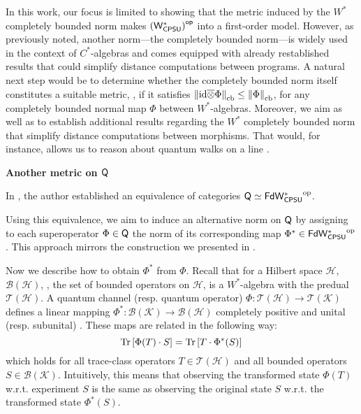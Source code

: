 In this work, our focus is limited to showing that the metric induced by the $W^*$ completely bounded norm makes $\left(\mathsf{W^*_{CPSU}}\right)^{\mathsf{op}}$ into a first-order model. However, as previously noted, another norm---the completely bounded norm---is widely used in the context of $C^*$-algebras and comes equipped with already restablished results that could simplify distance computations between programs.  A natural next step would be to determine whether the completely bounded norm itself constitutes a suitable metric, \ie, if it satisfies $\left\lVert \mathrm{id} \overline{\otimes} \Phi \right\rVert_{\text{cb}} \leq \left\lVert \Phi \right\rVert_{\text{cb}}$, for any completely bounded normal map $\Phi$ between $W^*$-algebras. Moreover, we aim as well as to establish additional results regarding the $W^*$ completely bounded norm that simplify distance computations between morphisms. That would, for instance, allows us to reason about quantum walks on a line \cite{venegasQuantumWalksComprehensive2012}.

\textbf{Another metric on $\mathsf{Q}$}



In \cite{choSemanticsQuantumProgramming2016}, the author established an equivalence of categories  
$\mathsf{Q} \simeq \mathsf{FdW^*_{CPSU}}^{\mathrm{op}}$.  

Using this equivalence, we aim to induce an alternative norm on $\mathsf{Q}$ by assigning to each superoperator $\Phi \in \mathsf{Q}$ the norm of its corresponding map $\Phi^* \in \mathsf{FdW^*_{CPSU}}^{\mathrm{op}}$. This approach mirrors the construction we presented in .

Now we describe how to obtain  $\Phi^*$ from $\Phi$. 
Recall that for a Hilbert space \( \mathcal{H} \), \( \mathcal{B}(\mathcal{H}) \), \ie, the set of bounded operators on \( \mathcal{H} \), is a \( W^* \)-algebra with the predual \( \mathcal{T}(\mathcal{H}) \).
A quantum channel (resp. quantum operator) $\Phi: \mathcal{T}(\mathcal{H})  \to \mathcal{T}(\mathcal{K})$ defines a linear mapping 
$\Phi^*: \mathcal{B}(\mathcal{K}) \to \mathcal{B}(\mathcal{H})$ completely positive and unital (resp. subunital) \cite[Proposition 5.1,]{choSemanticsQuantumProgramming2016}. These maps are related in the following way:
\begin{equation*}
\text{Tr}\left[\Phi(T) \cdot S\right] = \text{Tr} \left[T \cdot \Phi^*(S)\right]
\end{equation*}
which holds for all trace-class operators $T \in \mathcal{T}(\mathcal{H})$ and all bounded operators $S \in \mathcal{B}(\mathcal{K})$.
Intuitively, this means that observing the transformed state $\Phi(T)$ w.r.t. experiment $S$ is the same as observing the original state $S$ w.r.t. the transformed state $\Phi^*(S)$.

